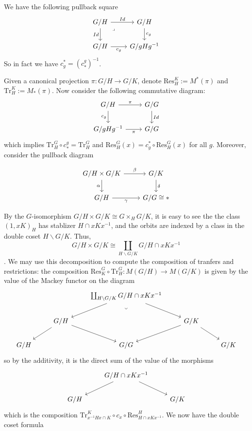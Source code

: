 \documentclass{article}
\theoremstyle{definition}
\theoremstyle{definition}
\theoremstyle{definition}
\theoremstyle{definition}
\theoremstyle{definition}
\theoremstyle{definition}
\theoremstyle{definition}
\begin{document}
We have the following pullback square 
\[\begin{tikzcd}
	{G/H} & {G/H} \\
	{G/H} & {G/gHg^{-1}}
	\arrow["Id", from=1-1, to=1-2]
	\arrow["Id"', from=1-1, to=2-1]
	\arrow["\lrcorner"{anchor=center, pos=0.125}, draw=none, from=1-1, to=2-2]
	\arrow["{c_g}", from=1-2, to=2-2]
	\arrow["{c_g}"', from=2-1, to=2-2]
\end{tikzcd}\]
So in fact we have $c_g^*=(c^g_*)^{-1}$. 

Given a canonical projection $\pi: G/H\to G/K$, denote $\textrm{Res}_H^K:= M^*(\pi)$ and  $\textrm{Tr}_H^K:= M_*(\pi)$. 
 Now consider the following commutative diagram:
\[\begin{tikzcd}
	{G/H} & {G/G} \\
	{G/gHg^{-1}} & {G/G}
	\arrow["\pi", from=1-1, to=1-2]
	\arrow["{c_g}"', from=1-1, to=2-1]
	\arrow["Id", from=1-2, to=2-2]
	\arrow["\pi"', from=2-1, to=2-2]
\end{tikzcd}\]
which implies $\textrm{Tr}_H^G\circ c_*^g=\textrm{Tr}_H^G$ and $\textrm{Res}_H^G(x)=c_g^*\circ\textrm{Res}_H^G(x)$ for all $g$. Moreover, consider the pullback diagram


\[\begin{tikzcd}
	G/H\times G/K & G/K \\
	G/H & G/G\cong *
	\arrow["\beta", from=1-1, to=1-2]
	\arrow["\alpha"', from=1-1, to=2-1]
	\arrow["\delta", from=1-2, to=2-2]
	\arrow["\gamma"', from=2-1, to=2-2]
\end{tikzcd}\]

By the $G$-isomorphism $G/H\times G/K\cong G\times_H G/K$, it is easy to see the the class $(1,xK)_H$ has stablizer $H\cap xKx^{-1}$, and the orbits are indexed by a class in the double coset $H\backslash G/K$. Thus, $$G/H\times G/K\cong \coprod_{H\backslash G/K}G/H\cap xKx^{-1}$$. 
We may use this decomposition to compute the composition of tranfers and restrictions: the composition $\textrm{Res}_K^G\circ \textrm{Tr}_H^G: M(G/H)\to M(G/K)$ is given by the value of the Mackey functor on the diagram 
\[\begin{tikzcd}
	&& {\coprod_{H\backslash G/K} G/H\cap xKx^{-1}} \\
	& {G/H} && {G/K} \\
	{G/H} && {G/G} && {G/K}
	\arrow[from=1-3, to=2-2]
	\arrow[from=1-3, to=2-4]
	\arrow["\lrcorner"{anchor=center, pos=0.125, rotate=-45}, draw=none, from=1-3, to=3-3]
	\arrow[from=2-2, to=3-1]
	\arrow[from=2-2, to=3-3]
	\arrow[from=2-4, to=3-3]
	\arrow[from=2-4, to=3-5]
\end{tikzcd}\]
so by the additivity, it is the direct sum of the value of the morphisms
\[\begin{tikzcd}
	& {G/H\cap xKx^{-1}} \\
	{G/H} && {G/K}
	\arrow[from=1-2, to=2-1]
	\arrow[from=1-2, to=2-3]
\end{tikzcd}\]
which is the composition $\textrm{Tr}_{x^{-1}Hx\cap K}^{K}\circ c_{x}\circ \textrm{Res}_{H\cap xKx^{-1}}^{H}$. We now have the double coset formula
\end{document}
